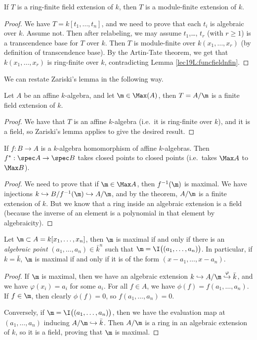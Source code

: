  \begin{lemma}[Zariski]
   If $T$ is a ring-finite field extension of $k$, then $T$ is a module-finite extension
   of $k$.
 \end{lemma}
 \begin{proof}
   We have $T=k[t_1,\dots, t_n]$, and we need to prove that each $t_i$ is algebraic over
   $k$. Assume not. Then after relabeling, we may assume $t_1$,\dots, $t_r$ (with $r\ge
   1$) is a transcendence base for $T$ over $k$. Then $T$ is module-finite over
   $k(x_1,\dots, x_r)$ (by definition of transcendence base). By the Artin-Tate theorem,
   we get that $k(x_1,\dots, x_r)$ is ring-finite over $k$, contradicting Lemma
   \ref{lec19L:funcfieldnfin}.
 \end{proof}
 We can restate Zariski's lemma in the following way.
 \begin{theorem}
   Let $A$ be an affine $k$-algebra, and let $\m\in \Max(A)$, then $T=A/\m$ is a finite
   field extension of $k$.
 \end{theorem}
 \begin{proof}
   We have that $T$ is an affine $k$-algebra (i.e.\ it is ring-finite over $k$), and it
   is a field, so Zariski's lemma applies to give the desired result.
 \end{proof}
 \begin{corollary} \label{lec20C:1}
   If $f:B\to A$ is a $k$-algebra homomorphism of affine $k$-algebras. Then $f^*:\spec
   A\to \spec B$ takes closed points to closed points (i.e.\ takes $\Max A$ to $\Max B$).
 \end{corollary}
 \begin{proof}
   We need to prove that if $\m\in \Max A$, then $f^{-1}(\m)$ is maximal. We have
   injections $k\hookrightarrow B/f^{-1}(\m)\hookrightarrow A/\m$, and by the theorem,
   $A/\m$ is a finite extension of $k$. But we know that a ring inside an algebraic
   extension is a field (because the inverse of an element is a polynomial in that
   element by algebraicity).
 \end{proof}
 \begin{corollary}
   Let $\m\subset A=k[x_1,\dots, x_n]$, then $\m$ is maximal if and only if there is an
   \emph{algebraic point} $(a_1,\dots, a_n)\in \bar k^n$ such that
   $\m=\I\bigl((a_1,\dots, a_n)\bigr)$. In particular, if $k=\bar k$, $\m$ is maximal if
   and only if it is of the form $(x-a_1,\dots, x-a_n)$.
 \end{corollary}
 \begin{proof}
   If $\m$ is maximal, then we have an algebraic extension $k\hookrightarrow
   A/\m\stackrel{\varphi}{\hookrightarrow} \bar k$, and we have $\varphi(x_i)=a_i$ for
   some $a_i$. For all $f\in A$, we have $\phi(f)=f(a_1,\dots, a_n)$. If $f\in \m$, then
   clearly $\phi(f)=0$, so $f(a_1,\dots, a_n)=0$.

   Conversely, if $\m=\I\bigl((a_1,\dots, a_n)\bigr)$, then we have the evaluation map at
   $(a_1,\dots, a_n)$ inducing $A/\m\hookrightarrow \bar k$. Then $A/\m$ is a ring in an
   algebraic extension of $k$, so it is a field, proving that $\m$ is maximal.
 \end{proof}
